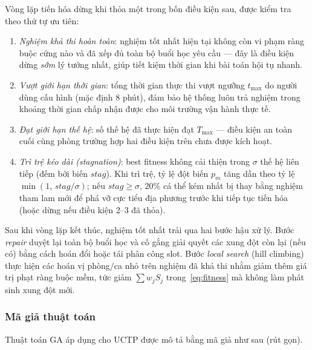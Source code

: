 \documentclass[a4paper,12pt,oneside]{article}
\begin{document}
	Vòng lặp tiến hóa dừng khi thỏa một trong bốn điều kiện sau, được kiểm tra theo thứ tự ưu tiên:
\begin{enumerate}
	\item \textit{Nghiệm khả thi hoàn toàn}: nghiệm tốt nhất hiện tại không còn vi phạm ràng buộc cứng nào và đã xếp đủ toàn bộ buổi học yêu cầu --- đây là điều kiện dừng \textit{sớm} lý tưởng nhất, giúp tiết kiệm thời gian khi bài toán hội tụ nhanh.
	\item \textit{Vượt giới hạn thời gian}: tổng thời gian thực thi vượt ngưỡng $t_{\max}$ do người dùng cấu hình (mặc định 8 phút), đảm bảo hệ thống luôn trả nghiệm trong khoảng thời gian chấp nhận được cho môi trường vận hành thực tế.
	\item \textit{Đạt giới hạn thế hệ}: số thế hệ đã thực hiện đạt $T_{\max}$ --- điều kiện an toàn cuối cùng phòng trường hợp hai điều kiện trên chưa được kích hoạt.
	\item \textit{Trì trệ kéo dài (stagnation)}: best fitness không cải thiện trong $\sigma$ thế hệ liên tiếp (đếm bởi biến $\mathit{stag}$). Khi trì trệ, tỷ lệ đột biến $p_m$ tăng dần theo tỷ lệ $\min(1,\,\mathit{stag}/\sigma)$; nếu $\mathit{stag} \geq \sigma$, 20\% cá thể kém nhất bị thay bằng nghiệm tham lam mới để phá vỡ cực tiểu địa phương trước khi tiếp tục tiến hóa (hoặc dừng nếu điều kiện 2--3 đã thỏa).
\end{enumerate}

Sau khi vòng lặp kết thúc, nghiệm tốt nhất trải qua hai bước hậu xử lý. Bước \textit{repair} duyệt lại toàn bộ buổi học và cố gắng giải quyết các xung đột còn lại (nếu có) bằng cách hoán đổi hoặc tái phân công slot. Bước \textit{local search} (hill climbing) thực hiện các hoán vị phòng/ca nhỏ trên nghiệm đã khả thi nhằm giảm thêm giá trị phạt ràng buộc mềm, tức giảm $\sum w_j S_j$ trong~\eqref{eq:fitness} mà không làm phát sinh xung đột mới.
	
	\subsubsection{Mã giả thuật toán}
	
	Thuật toán GA áp dụng cho UCTP được mô tả bằng mã giả như sau (rút gọn).
	
\end{document}
